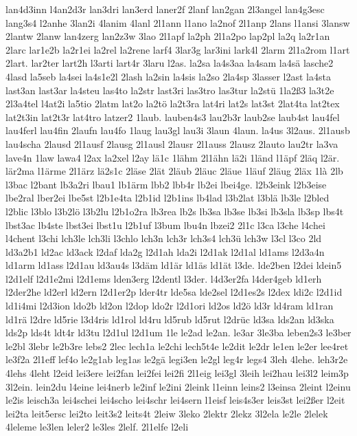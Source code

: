 {lan4d3inn
l4an2d3r
lan3dri
lan3erd
laner2f
2lanf
lan2gan
2l3angel
lan4g3esc
lang3s4
l2anhe
3lan2i
4lanim
4lanl
2l1ann
l1ano
la2nof
2l1anp
2lans
l1ansi
3lansw
2lantw
2lanw
lan4zerg
lan2z3w
3lao
2l1apf
la2ph
2l1a2po
lap2pl
la2q
la2r1an
2larc
lar1e2b
la2r1ei
la2rel
la2rene
larf4
3lar3g
lar3ini
lark4l
2larm
2l1a2rom
l1art
2lart.
lar2ter
lart2h
l3arti
lart4r
3laru
l2as.
la2sa
la4s3aa
la4sam
la4sä
lasche2
4lasd
la5seb
la4sei
la4s1e2l
2lash
la2sin
la4sis
la2so
2la4sp
3lasser
l2ast
la4sta
last3an
last3ar
la4steu
las4to
la2str
last3ri
las3tro
las3tur
la2stü
1la2ß3
la3t2e
2l3a4tel
l4at2i
la5tio
2latm
lat2o
la2tö
la2t3ra
lat4ri
lat2s
lat3st
2lat4ta
lat2tex
lat2t3in
lat2t3r
lat4tro
latzer2
1laub.
lauben4s3
lau2b3r
laub2se
laub4st
lau4fel
lau4ferl
lau4fin
2laufn
lau4fo
1laug
lau3gl
lau3i
3laun
4laun.
la4us
3l2aus.
2l1ausb
lau4scha
2lausd
2l1ausf
2lausg
2l1ausl
2lausr
2l1auss
2lausz
2lauto
lau2tr
la3va
lave4n
1law
lawa4
l2ax
la2xel
l2ay
lä1c
1lähm
2l1ähn
lä2i
1länd
l1äpf
2läq
l2är.
lär2ma
l1ärme
2l1ärz
lä2s1c
2läse
2lät
2läub
2läuc
2läue
1läuf
2läug
2läx
1là
2lb
l3bac
l2bant
lb3a2ri
lbau1
lb1ärm
lbb2
lbb4r
lb2ei
lbei4ge.
l2b3eink
l2b3eise
lbe2ral
lber2ei
lbe5st
l2b1e4ta
l2b1id
l2b1ins
lb4lad
l3b2lat
l3blä
lb3le
l2bled
l2blic
l3blo
l3b2lö
l3b2lu
l2b1o2ra
lb3rea
lb2s
lb3sa
lb3se
lb3si
lb3sla
lb3sp
lbs4t
lbst3ac
lb4ste
lbst3ei
lbst1u
l2b1uf
l3bum
lbu4n
lbzei2
2l1c
l3ca
l3che
l4chei
l4chent
l3chi
lch3le
lch3li
l3chlo
lch3n
lch3r
lch3s4
lch3ü
lch3w
l3cl
l3co
2ld
ld3a2b1
ld2ac
ld3ack
l2daf
lda2g
l2d1ah
lda2i
l2d1ak
l2d1al
ld1ams
l2d3a4n
ld1arm
ld1ass
l2d1au
ld3au4s
l3däm
ld1är
ld1äs
ld1ät
l3de.
lde2ben
l2dei
ldein5
l2d1elf
l2d1e2mi
l2d1ems
lden3erg
l2dentl
l3der.
l4d3er2fa
l4der4geb
ld1erh
l2der2he
ld2erl
ld2ern
l2d1er2p
lder4tr
lde5sa
lde2sel
l2d1es2s
l2dex
ldi2c
l2d1id
ld1i4mi
l2d3ion
ldo2b
ld2on
l2dop
ldo2r
l2d1ori
ld2os
ld2ö
ld3r
ld4ram
ld1ran
ld1rä
l2dre
ld5rie
l3d4ris
ld1rol
ld4ru
ld5rub
ld5rut
l2drüc
ld3sa
lds2an
ld3ska
lds2p
lds4t
ldt4r
ld3tu
l2d1ul
l2d1um
1le
le2ad
le2an.
le3ar
3le3ba
leben2s3
le3ber
le2bl
3lebr
le2b3re
lebs2
2lec
lech1a
le2chi
lech5t4e
le2dit
le2dr
le1en
le2er
lee4ret
le3f2a
2l1eff
lef4o
le2g1ab
leg1as
le2gä
legi3en
le2gl
leg4r
legs4
3leh
4lehe.
leh3r2e
4lehs
4leht
l2eid
lei3ere
lei2fan
lei2fei
lei2fi
2l1eig
lei3gl
3leih
lei2hau
lei3l2
leim3p
3l2ein.
lein2du
l4eine
lei4nerb
le2inf
le2ini
2leink
l1einn
leins2
l3einsa
2leint
l2einu
le2is
leisch3a
lei4schei
lei4scho
lei4schr
lei4sern
l1eisf
leis4s3er
leis3st
lei2ßer
l2eit
lei2ta
leit5ersc
lei2to
leit3s2
leits4t
2leiw
3leko
2lektr
2lekz
3l2ela
le2le
2lelek
4leleme
le3len
leler2
le3les
2lelf.
2l1elfe
l2eli
}
